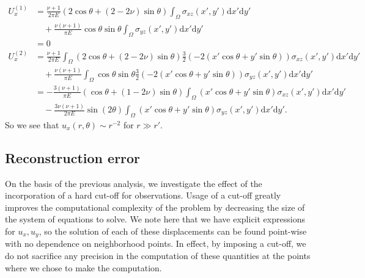 \documentclass{article}
\newcommand{\dd}{\mathrm{d}}
\begin{document}
\begin{align}
U_x^{(1)} &= \frac{\nu+1}{2\pi E} (2\cos\theta + (2-2\nu)\sin\theta) \int_\Omega \sigma_{xz}(x',y')\dd x' \dd y' \nonumber\\
&\quad+\frac{\nu(\nu+1)}{\pi E}\cos\theta\sin\theta \int_\Omega \sigma_{yz}(x',y')\dd x' \dd y' \nonumber \\
&=0 \\
U_x^{(2)} &=  \frac{\nu+1}{2\pi E}\int_\Omega (2\cos\theta + (2-2\nu)\sin\theta)\frac{3}{2}(-2(x'\cos\theta+y'\sin\theta)) \sigma_{xz}(x',y') \dd x' \dd y' \nonumber \\
&\quad+\frac{\nu(\nu+1)}{\pi E} \int_\Omega \cos\theta\sin\theta\frac{3}{2}(-2(x'\cos\theta+y'\sin\theta)) \sigma_{yz}(x',y') \dd x' \dd y' \nonumber \\
&=-\frac{3(\nu+1)}{\pi E}(\cos\theta + (1-2\nu)\sin\theta) \int_{\Omega} (x'\cos\theta + y'\sin\theta ) \sigma_{xz}(x',y') \dd x' \dd y' \nonumber \\ 
&\quad - \frac{3\nu(\nu+1)}{2\pi E}\sin(2\theta) \int_\Omega(x'\cos\theta + y'\sin\theta ) \sigma_{yz}(x',y') \dd x' \dd y' .
\end{align}
So we see that $u_x(r,\theta)\sim r^{-2}$ for $r\gg r'$.

\subsection{Reconstruction error}

On the basis of the previous analysis, we investigate the effect of the incorporation of a hard cut-off for observations. Usage of a cut-off greatly improves the computational complexity of the problem by decreasing the size of the system of equations to solve. We note here that we have explicit expressions for $u_x,u_y$, so the solution of each of these displacements can be found point-wise with no dependence on neighborhood points. In effect, by imposing a cut-off, we do not sacrifice any precision in the computation of these quantities at the points where we chose to make the computation.
\end{document}
